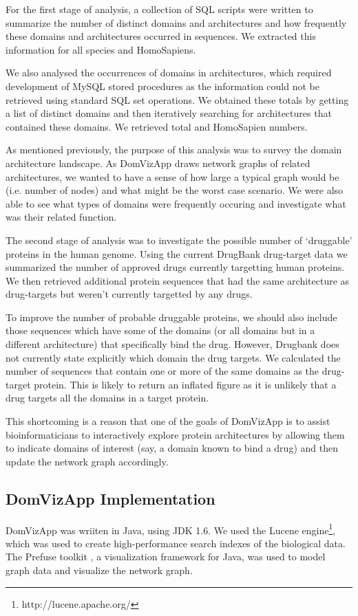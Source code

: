 For the first stage of analysis, a collection of SQL scripts were written to summarize the number of distinct domains and architectures and how frequently these domains and architectures occurred in sequences. We extracted this information for all species and HomoSapiens.

We also analysed the occurrences of domains in architectures, which required development of MySQL stored procedures as the information could not be retrieved using standard SQL set operations. We obtained these totals by getting a list of distinct domains and then iteratively searching for architectures that contained these domains. We retrieved total and HomoSapien numbers.

As mentioned previously, the purpose of this analysis was to survey the domain architecture landscape. As DomVizApp draws network graphs of related architectures, we wanted to have a sense of how large a typical graph would be (i.e. number of nodes) and what might be the worst case scenario. We were also able to see what types of domains were frequently occuring and investigate what was their related function.

The second stage of analysis was to investigate the possible number of `druggable' proteins in the human genome. Using the current DrugBank drug-target data we summarized the number of approved drugs currently targetting human proteins. We then retrieved additional protein sequences that had the same architecture as drug-targets but weren't currently targetted by any drugs.

To improve the number of probable druggable proteins, we should also include those sequences which have some of the domains (or all domains but in a different architecture) that specifically bind the drug. However, Drugbank does not currently state explicitly which domain the drug targets. We calculated the number of sequences that contain one or more of the same domains as the drug-target protein. This is likely to return an inflated figure as it is unlikely that a drug targets all the domains in a target protein.

This shortcoming is a reason that one of the goals of DomVizApp is to assist bioinformaticians to interactively explore protein architectures by allowing them to indicate domains of interest (say, a domain known to bind a drug) and then update the network graph accordingly.

\subsection{DomVizApp Implementation}
DomVizApp was wriiten in Java, using JDK 1.6. We used the Lucene engine\footnote{http://lucene.apache.org/}, which was used to create high-performance search indexes of the biological data. The Prefuse toolkit \cite{prefuse}, a visualization framework for Java, was used to model graph data and visualize the network graph.

